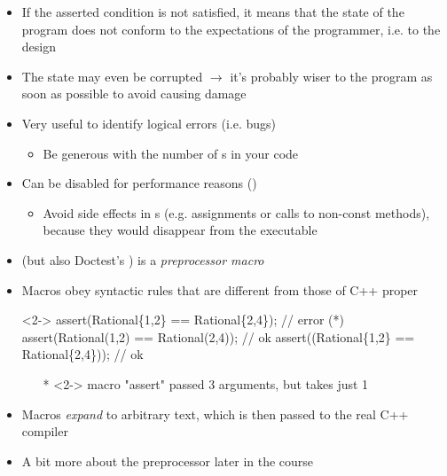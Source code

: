 \begin{frame}[fragile]{ \insertcontinuationtext}

  \begin{itemize}
  \item If the asserted condition is not satisfied, it means that the state of the
    program does not conform to the expectations of the programmer, i.e. to the
    design
  \item The state may even be corrupted $\rightarrow$ it's probably wiser to
     the program as soon as possible to avoid causing damage
  \item Very useful to identify logical errors (i.e. bugs)
    \begin{itemize}
    \item Be generous with the number of s in your code
    \end{itemize}
  \item Can be disabled for performance reasons ()
    \begin{itemize}
    \item Avoid side effects in s (e.g. assignments or calls to
      non-const methods), because they would disappear from the executable
    \end{itemize}
  \end{itemize}

\end{frame}

\begin{frame}[fragile]{ \insertcontinuationtext}

  \begin{itemize}
  \item {} (but also Doctest's ) is a
    \textit{preprocessor macro}
  \item Macros obey syntactic rules that are different from those of C++ proper

    \begin{codeblock}<2->{
assert(Rational\{1\alert{,}2\} == Rational\{2\alert{,}4\});   // error (*)
assert(Rational\alert{(}1,2\alert{)} == Rational\alert{(}2,4\alert{)});   // ok
assert(\alert{(}Rational\{1,2\} == Rational\{2,4\}\alert{)}); // ok}\end{codeblock}

    {\tiny\begin{itemize}
    \item[*]<2-> macro "assert" passed 3 arguments, but takes just 1
    \end{itemize}}
  \item<3-> Macros \textit{expand} to arbitrary text, which is then passed to the
    real C++ compiler
  \item<3-> A bit more about the preprocessor later in the course
  \end{itemize}

\end{frame}

